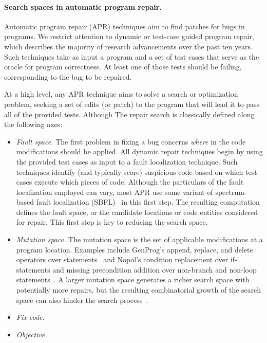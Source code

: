\documentclass[sigconf, timestamp-false, anonymous=true]{acmart}
\begin{document}
\paragraph{Search spaces in automatic program repair.} Automatic program repair (APR) techniques aim to find patches for bugs in
programs.  We restrict attention to dynamic or test-case guided program repair,
which describes the majority of research advancements over the past ten years.
Such techniques take as input a program and a set of test cases that serve as
the oracle for program correctness.  At least one of those tests should be
failing, corresponding to the bug to be repaired.  

At a high level, any APR technique aims to solve a search or optimization
problem, seeking a set of edits (or patch) to the program that will lead it to
pass all of the provided tests.  Although The repair search is classically defined along
the following axes:
\begin{itemize}
\item \emph{Fault space.} The first problem in fixing a bug concerns
  \emph{where} in the code modifications should be applied. All dynamic repair
  techniques begin by using the provided test cases as input to a fault
  localization technique. Such techniques identify (and typically score)
  suspicious code based on which test cases execute which pieces of code.
  Although the particulars of the fault localization employed can vary, most APR
  use some variant of spectrum-based fault localization (SBFL)~\cite{refs} in
  this first step. The resulting computation defines the fault space, or the
  candidate locations or code entities considered for repair. This first step is
  key to reducing the search space.

\item \emph{Mutation space.} The mutation space is the set of applicable 
modifications at a program location. Examples include GenProg's append, 
replace, and delete operators over statements~\cite{genprog-operators} and 
Nopol's condition replacement over if-statements and missing precondition 
addition over non-branch and non-loop statements~\cite{Xuan17}.
A larger mutation space generates 
a richer search space with potentially more repairs, but
the resulting combinatorial growth of the search space can also hinder 
the search process~\cite{long-search-spaces}.

\item \emph{Fix code.}

\item \emph{Objective.} 

\end{itemize}
\end{document}
